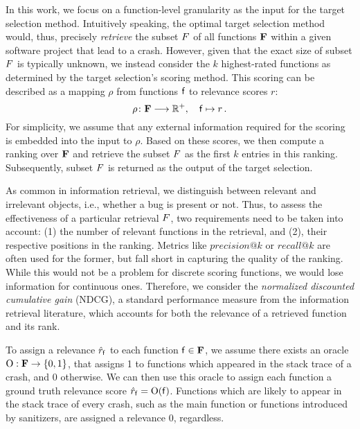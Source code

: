 In this work, we focus on a function-level granularity as the input for the target selection method.
%
Intuitively speaking, the optimal target selection method would, thus, precisely \emph{retrieve} the subset $F$ of all functions $\mathbf{F}$ within a given software project that lead to a crash. %
%
However, given that the exact size of subset $F$ is typically unknown, we instead consider the $k$ highest-rated functions as determined by the target selection's scoring method.
%
This scoring can be described as a mapping $\rho$ from functions $\mathsf{f}$ to relevance scores $r$:
$$
   \rho \colon \mathbf{F} \longrightarrow \mathbb{R}^+, \quad 
   \mathsf{f} \mapsto r \,.
$$
For simplicity, we assume that any external information required for the scoring is embedded into the input to $\rho$.
%
Based on these scores, we then compute a ranking over $\mathbf{F}$ and retrieve the subset $F$ as the first $k$ entries in this ranking. Subsequently, subset $F$ is returned as the output of the target selection.

As common in information retrieval, we distinguish between relevant and irrelevant objects, i.e., whether a bug is present or not.
%
Thus, to assess the effectiveness of a particular retrieval $F$, two requirements need to be taken into account: (1) the number of relevant functions in the retrieval, and (2), their respective positions in the ranking.
%
Metrics like $precision@k$ or $recall@k$ are often used for the former, but fall short in capturing the quality of the ranking. While this would not be a problem for discrete scoring functions, we would lose information for continuous ones. Therefore, we consider the \emph{normalized discounted cumulative gain} (NDCG), a standard performance measure from the information retrieval literature, which accounts for both the relevance of a retrieved function and its rank.

To assign a relevance $\hat{r}_{\mathsf{f}}$ to each function $\mathsf{f} \in \mathbf{F}$, we assume there exists an oracle $\mathrm{O}: \mathbf{F} \rightarrow \{0, 1\}$, that assigns 1 to functions which appeared in the stack trace of a crash, and 0 otherwise.
We can then use this oracle to assign each function a ground truth relevance score $\hat{r}_{\mathsf{f}} = \mathrm{O}(\mathsf{f})$.
%
Functions which are likely to appear in the stack trace of every crash, such as the main function or functions introduced by sanitizers, are assigned a relevance 0, regardless.

